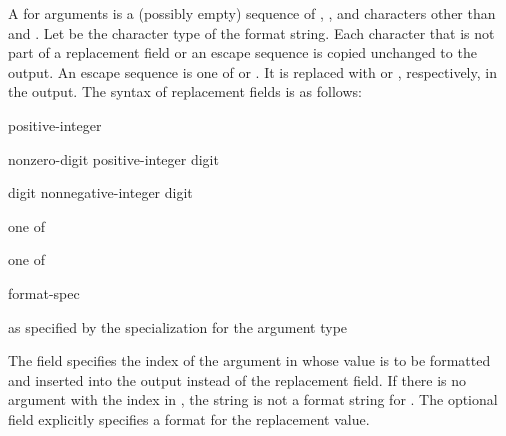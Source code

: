 \pnum
A  for arguments  is
a (possibly empty) sequence of
,
,
and characters other than \tcode{\{} and \tcode{\}}.
Let  be the character type of the format string.
Each character that is not part of
a replacement field or an escape sequence
is copied unchanged to the output.
An escape sequence is one of \tcode{\{\{} or \tcode{\}\}}.
It is replaced with \tcode{\{} or \tcode{\}}, respectively, in the output.
The syntax of replacement fields is as follows:

\begin{ncbnf}
\br
    \terminal{\{}   \terminal{\}}
\end{ncbnf}

\begin{ncbnf}
\br
    \br
    positive-integer
\end{ncbnf}

\begin{ncbnf}
\br
    nonzero-digit\br
    positive-integer digit
\end{ncbnf}

\begin{ncbnf}
\br
    digit\br
    nonnegative-integer digit
\end{ncbnf}

\begin{ncbnf}
 \textnormal{one of}\br
\end{ncbnf}

\begin{ncbnf}
 \textnormal{one of}\br
\end{ncbnf}

\begin{ncbnf}
\br
    \terminal{:} format-spec
\end{ncbnf}

\begin{ncbnf}
\br
    \textnormal{as specified by the  specialization for the argument type}
\end{ncbnf}

\pnum
The  field specifies the index of
the argument in 
whose value is to be formatted and inserted into the output
instead of the replacement field.
If there is no argument with
the index  in ,
the string is not a format string for .
The optional  field
explicitly specifies a format for the replacement value.

